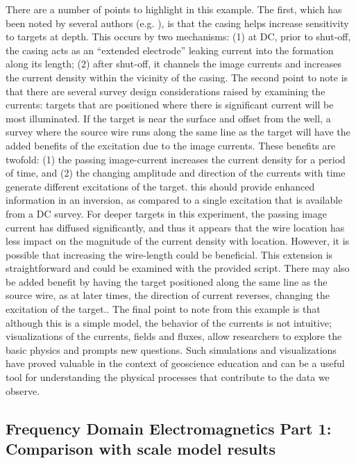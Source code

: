 \documentclass[preprint,review,3p,times,onecolumn,authoryear]{elsarticle}
\begin{document}
There are a number of points to highlight in this example. The first, which has been noted by several authors (e.g. \cite{Schenkel1994, Hoversten2015}), is that the casing helps increase sensitivity to targets at depth. This occurs by two mechanisms: (1) at DC, prior to shut-off, the casing acts as an ``extended electrode'' leaking current into the formation along its length; (2) after shut-off, it channels the image currents and increases the current density within the vicinity of the casing. The second point to note is that there are several survey design considerations raised by examining the currents: targets that are positioned where there is significant current will be most illuminated. If the target is near the surface and offset from the well, a survey where the source wire runs along the same line as the target will have the added benefits of the excitation due to the image currents. These benefits are twofold: (1) the passing image-current increases the current density for a period of time, and (2) the changing amplitude and direction of the currents with time generate different excitations of the target. this should provide enhanced information in an inversion, as compared to a single excitation that is available from a DC survey. For deeper targets in this experiment, the passing image current has diffused significantly, and thus it appears that the wire location has less impact on the magnitude of the current density with location. However, it is possible that increasing the wire-length could be beneficial. This extension is straightforward and could be examined with the provided script. There may also be added benefit by having the target positioned along the same line as the source wire, as at later times, the direction of current reverses, changing the excitation of the target.. The final point to note from this example is that although this is a simple model, the behavior of the currents is not intuitive; visualizations of the currents, fields and fluxes, allow researchers to explore the basic physics and prompts new questions. Such simulations and visualizations have proved valuable in the context of geoscience education \citep{Oldenburg2017} and can be a useful tool for understanding the physical processes that contribute to the data we observe.



\subsection{Frequency Domain Electromagnetics Part 1: Comparison with scale model results}
\label{sec:FDEM_part1}
\end{document}
